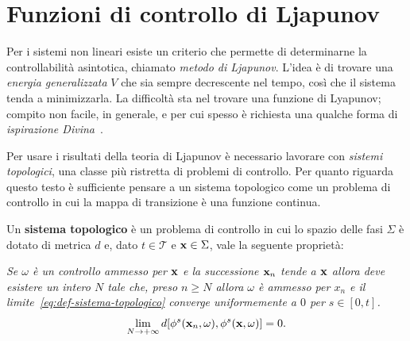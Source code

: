 \section{Funzioni di controllo di Ljapunov}
Per i sistemi non lineari esiste un criterio che permette di determinarne
la controllabilità asintotica, chiamato \emph{metodo di Ljapunov}.
L'idea è di trovare una \emph{energia generalizzata} $V$
che sia sempre decrescente nel tempo,
così che il sistema tenda a minimizzarla.
La difficoltà sta nel trovare una funzione di Lyapunov;
compito non facile, in generale, e per cui spesso è richiesta
una qualche forma di \emph{ispirazione Divina}~\cite{strogatz}.


Per usare i risultati della teoria di Ljapunov è necessario lavorare
con \emph{sistemi topologici}, una classe più ristretta di problemi di controllo.
Per quanto riguarda questo testo è sufficiente pensare a un sistema topologico
come un problema di controllo in cui la mappa di transizione è una funzione
continua.

\begin{definition}
    Un \textbf{sistema topologico} è un problema di controllo in
    cui lo spazio delle fasi $\Sigma$ è dotato di metrica $d$ e,
    dato $t \in \mathcal T$ e $\mathbf{x} \in \Sigma$,
    vale la seguente proprietà:

    \emph{Se $\omega$ è un controllo ammesso per $\mathbf{x}$ e la successione
    ${\mathbf{x}_n}$ tende a $\mathbf{x}$ allora deve esistere un intero
    $N$ tale che, preso $n \geq N$ allora $\omega$ è ammesso per $x_n$
    e il limite~\eqref{eq:def-sistema-topologico} converge uniformemente a $0$ per $s \in [0, t]$.}
    \begin{equation}
        \lim_{N \to +\infty} d[\phi^s(\mathbf{x}_n, \omega), \phi^s(\mathbf{x}, \omega)] = 0.
        \label{eq:def-sistema-topologico}
    \end{equation}
\end{definition}


